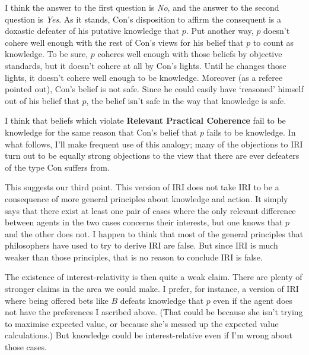 \documentclass[
  11pt,
  letterpaper,
  DIV=11,
  numbers=noendperiod,
  oneside]{scrartcl}
\begin{document}
I think the answer to the first question is \emph{No}, and the answer to
the second question is \emph{Yes}. As it stands, Con's disposition to
affirm the consequent is a doxastic defeater of his putative knowledge
that \(p\). Put another way, \(p\) doesn't cohere well enough with the
rest of Con's views for his belief that \(p\) to count as knowledge. To
be sure, \(p\) coheres well enough with those beliefs by objective
standards, but it doesn't cohere at all by Con's lights. Until he
changes those lights, it doesn't cohere well enough to be knowledge.
Moreover (as a referee pointed out), Con's belief is not safe. Since he
could easily have `reasoned' himself out of his belief that \(p\), the
belief isn't safe in the way that knowledge is safe.

I think that beliefs which violate \textbf{Relevant Practical Coherence}
fail to be knowledge for the same reason that Con's belief that \(p\)
fails to be knowledge. In what follows, I'll make frequent use of this
analogy; many of the objections to IRI turn out to be equally strong
objections to the view that there are ever defeaters of the type Con
suffers from.

This suggests our third point. This version of IRI does not take IRI to
be a consequence of more general principles about knowledge and action.
It simply says that there exist at least one pair of cases where the
only relevant difference between agents in the two cases concerns their
interests, but one knows that \(p\) and the other does not. I happen to think that most of the general
principles that philosophers have used to try to derive IRI are false.
But since IRI is much weaker than those principles, that is no reason to
conclude IRI is false.

The existence of interest-relativity is then quite a weak claim. There
are plenty of stronger claims in the area we could make. I prefer, for
instance, a version of IRI where being offered bets like \(B\) defeats
knowledge that \(p\) even if the agent does not have the preferences I
ascribed above. (That could be because she isn't trying to maximise
expected value, or because she's messed up the expected value
calculations.) But knowledge could be interest-relative even if I'm
wrong about those cases.
\end{document}
